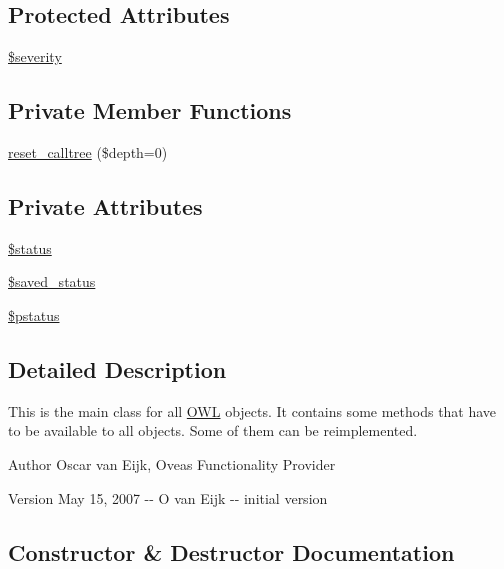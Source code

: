 \subsection*{Protected Attributes}
\begin{DoxyCompactItemize}
\item 
\hyperlink{class__OWL_ad26b40a9dbbacb33e299b17826f8327c}{\$severity}
\end{DoxyCompactItemize}
\subsection*{Private Member Functions}
\begin{DoxyCompactItemize}
\item 
\hyperlink{class__OWL_a91389e63fc76f6513147f302cbd92a2e}{reset\_\-calltree} (\$depth=0)
\end{DoxyCompactItemize}
\subsection*{Private Attributes}
\begin{DoxyCompactItemize}
\item 
\hyperlink{class__OWL_aaf448f6bc8a90e20c09e9e2b8fe46eb5}{\$status}
\item 
\hyperlink{class__OWL_a3fd6a7b2389b745c00a419dfb8cd7724}{\$saved\_\-status}
\item 
\hyperlink{class__OWL_af30c6ce2c59df6da2ef0f7059be9231e}{\$pstatus}
\end{DoxyCompactItemize}


\subsection{Detailed Description}
This is the main class for all \hyperlink{classOWL}{OWL} objects. It contains some methods that have to be available to all objects. Some of them can be reimplemented. \begin{DoxyAuthor}{Author}
Oscar van Eijk, Oveas Functionality Provider 
\end{DoxyAuthor}
\begin{DoxyVersion}{Version}
May 15, 2007 -\/-\/ O van Eijk -\/-\/ initial version 
\end{DoxyVersion}


\subsection{Constructor \& Destructor Documentation}
